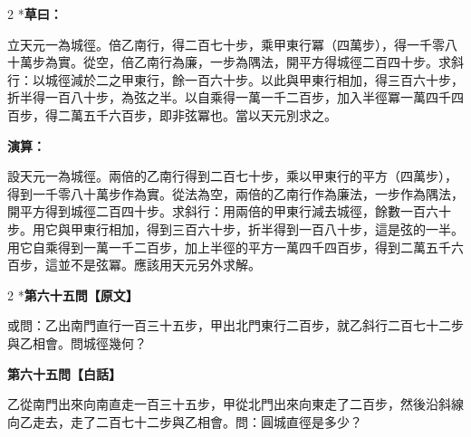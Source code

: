 \documentclass[11pt,a4paper]{article}
\begin{document}
\begin{paracol}{2}
\switchcolumn[0]*\textbf{草曰：}

\small 立天元一為城徑。倍乙南行，得二百七十步，乘甲東行冪（四萬步），得一千零八十萬步為實。從空，倍乙南行為廉，一步為隅法，開平方得城徑二百四十步。求斜行：以城徑減於二之甲東行，餘一百六十步。以此與甲東行相加，得三百六十步，折半得一百八十步，為弦之半。以自乘得一萬一千二百步，加入半徑冪一萬四千四百步，得二萬五千六百步，即非弦冪也。當以天元別求之。

\switchcolumn\textbf{演算：}

\small 設天元一為城徑。兩倍的乙南行得到二百七十步，乘以甲東行的平方（四萬步），得到一千零八十萬步作為實。從法為空，兩倍的乙南行作為廉法，一步作為隅法，開平方得到城徑二百四十步。求斜行：用兩倍的甲東行減去城徑，餘數一百六十步。用它與甲東行相加，得到三百六十步，折半得到一百八十步，這是弦的一半。用它自乘得到一萬一千二百步，加上半徑的平方一萬四千四百步，得到二萬五千六百步，這並不是弦冪。應該用天元另外求解。
\end{paracol}

\vspace{0.1cm}
\noindent{}
\par\vspace{0.3cm}

\begin{paracol}{2}
\switchcolumn[0]*\noindent\textbf{第六十五問【原文】}

\small 或問：乙出南門直行一百三十五步，甲出北門東行二百步，就乙斜行二百七十二步與乙相會。問城徑幾何？

\switchcolumn\noindent\textbf{第六十五問【白話】}

\small 乙從南門出來向南直走一百三十五步，甲從北門出來向東走了二百步，然後沿斜線向乙走去，走了二百七十二步與乙相會。問：圓城直徑是多少？
\end{paracol}

\vspace{0.1cm}
\noindent{}
\par\vspace{0.15cm}
\end{document}
